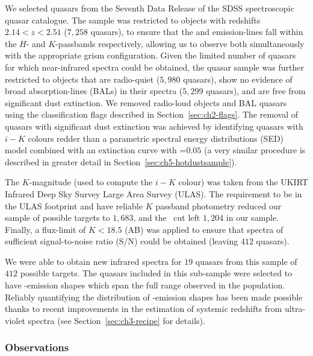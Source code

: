 We selected quasars from the Seventh Data Release \citep[DR7;][]{schneider10} of the SDSS spectroscopic quasar catalogue.  
The sample was restricted to objects with redshifts $2.14 < z <2.51$ ($7,258$ quasars), to ensure that the \hb and \ha emission-lines fall within the $H$- and $K$-passbands respectively, allowing us to observe both simultaneously with the appropriate grism configuration.
Given the limited number of quasars for which near-infrared spectra could be obtained, the quasar sample was further restricted to objects that are radio-quiet ($5,980$ quasars), show no evidence of broad absorption-lines (BALs) in their spectra ($5,299$ quasars), and are free from significant dust extinction. 
We removed radio-loud objects and BAL quasars using the classification flags described in Section~\ref{sec:ch2-flags}. 
The removal of quasars with significant dust extinction was achieved by identifying quasars with $i-K$ colours redder than a parametric spectral energy distributions (SED) model combined with an extinction curve with \ebv=$0.05$ (a very similar procedure is described in greater detail in Section~\ref{sec:ch5-hotdustsample}). 

The $K$-magnitude (used to compute the $i-K$ colour) was taken from the UKIRT Infrared Deep Sky Survey \citep[UKIDSS;][]{lawrence07} Large Area Survey (ULAS). 
The requirement to be in the ULAS footprint and have reliable $K$ passband photometry reduced our sample of possible targets to $1,683$, and the \ebv\, cut left $1,204$ in our sample. 
Finally, a flux-limit of $K<18.5$ (AB) was applied to ensure that spectra of sufficient signal-to-noise ratio (S/N) could be obtained (leaving $412$ quasars). 
 
We were able to obtain new infrared spectra for $19$ quasars from this sample of $412$ possible targets. 
The quasars included in this sub-sample were selected to have -emission shapes which span the full range observed in the population. 
Reliably quantifying the distribution of -emission shapes has been made possible thanks to recent improvements in the estimation of systemic redshifts from ultra-violet spectra (see Section~\ref{sec:ch3-recipe} for details). 

\subsubsection{Observations}

